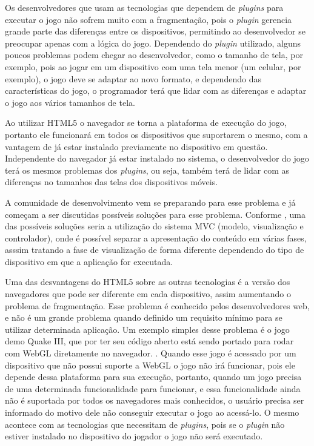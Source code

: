 Os desenvolvedores que usam as tecnologias que dependem de \textit{plugins} para executar o
jogo não sofrem muito com a fragmentação, pois o \textit{plugin} gerencia
grande parte das diferenças entre os dispositivos, permitindo ao
desenvolvedor se preocupar apenas com a lógica do jogo. Dependendo do
\textit{plugin} utilizado, alguns poucos problemas podem chegar ao
desenvolvedor, como o tamanho de tela, por exemplo, pois ao jogar em
um dispositivo com uma tela menor (um celular, por exemplo), o jogo
deve se adaptar ao novo formato, e dependendo das características do jogo, o
programador terá que lidar com as diferenças e adaptar o jogo aos
vários tamanhos de tela.

Ao utilizar HTML5 o navegador se torna a plataforma de execução do
jogo, portanto ele funcionará em todos os dispositivos que
suportarem o mesmo, com a vantagem de já estar instalado previamente
no dispositivo em questão.
Independente do navegador já estar instalado no sistema, o
desenvolvedor do jogo terá os mesmos problemas dos \textit{plugins}, ou seja,
também terá de lidar com as diferenças no tamanhos das telas dos
dispositivos móveis.

A comunidade de desenvolvimento vem se preparando para esse problema e
já começam a ser discutidas possíveis soluções para esse problema.
Conforme , uma das possíveis soluções seria a
utilização do sistema MVC (modelo, visualização e controlador), onde é
possível separar a apresentação do conteúdo em várias fases, asssim
tratando a fase de visualização de forma diferente dependendo do tipo
de dispositivo em que a aplicação for executada.

Uma das desvantagens do HTML5 sobre as outras tecnologias é a versão
dos navegadores que pode ser diferente em cada dispositivo, assim
aumentando o problema de fragmentação. Esse problema é conhecido pelos
desenvolvedores web, e não é um grande problema quando definido um
requisito mínimo para se utilizar determinada aplicação. Um exemplo
simples desse problema é o jogo demo Quake III, que por ter seu código
aberto está sendo portado para rodar com WebGL diretamente no navegador.
\cite{website:webglquake3}. Quando esse jogo é acessado por um
dispositivo que não possui suporte a WebGL o jogo não irá funcionar,
pois ele depende dessa plataforma para sua execução, portanto, quando
um jogo precisa de uma determinada funcionalidade para funcionar, e
essa funcionalidade ainda não é suportada por todos os navegadores
mais conhecidos, o usuário precisa ser informado do motivo dele não
conseguir executar o jogo ao acessá-lo. O mesmo acontece com as
tecnologias que necessitam de \textit{plugins}, pois se o \textit{plugin} não estiver
instalado no dispositivo do jogador o jogo não será executado.

